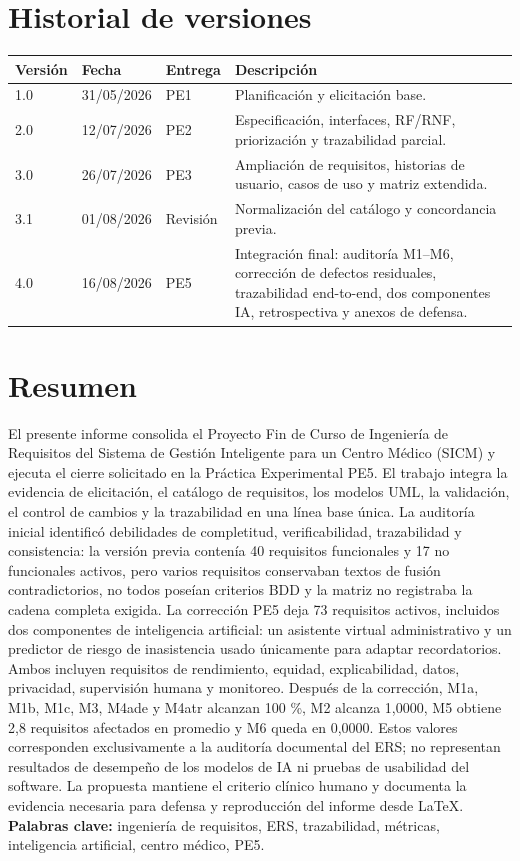 \documentclass[11pt,a4paper]{article}
\begin{document}
	\section*{Historial de versiones}
	\begin{longtable}{p{1.2cm}p{2cm}p{2.4cm}p{9cm}}
		\toprule\textbf{Versión}&\textbf{Fecha}&\textbf{Entrega}&\textbf{Descripción}\\\midrule\endhead
		1.0&31/05/2026&PE1&Planificación y elicitación base.\\
		2.0&12/07/2026&PE2&Especificación, interfaces, RF/RNF, priorización y trazabilidad parcial.\\
		3.0&26/07/2026&PE3&Ampliación de requisitos, historias de usuario, casos de uso y matriz extendida.\\
		3.1&01/08/2026&Revisión&Normalización del catálogo y concordancia previa.\\
		4.0&16/08/2026&PE5&Integración final: auditoría M1--M6, corrección de defectos residuales, trazabilidad end-to-end, dos componentes IA, retrospectiva y anexos de defensa.\\\bottomrule
	\end{longtable}
	\section*{Resumen}
	El presente informe consolida el Proyecto Fin de Curso de Ingeniería de Requisitos del Sistema de Gestión Inteligente para un Centro Médico (SICM) y ejecuta el cierre solicitado en la Práctica Experimental PE5. El trabajo integra la evidencia de elicitación, el catálogo de requisitos, los modelos UML, la validación, el control de cambios y la trazabilidad en una línea base única. La auditoría inicial identificó debilidades de completitud, verificabilidad, trazabilidad y consistencia: la versión previa contenía 40 requisitos funcionales y 17 no funcionales activos, pero varios requisitos conservaban textos de fusión contradictorios, no todos poseían criterios BDD y la matriz no registraba la cadena completa exigida. La corrección PE5 deja 73 requisitos activos, incluidos dos componentes de inteligencia artificial: un asistente virtual administrativo y un predictor de riesgo de inasistencia usado únicamente para adaptar recordatorios. Ambos incluyen requisitos de rendimiento, equidad, explicabilidad, datos, privacidad, supervisión humana y monitoreo. Después de la corrección, M1a, M1b, M1c, M3, M4ade y M4atr alcanzan 100 \%, M2 alcanza 1,0000, M5 obtiene 2,8 requisitos afectados en promedio y M6 queda en 0,0000. Estos valores corresponden exclusivamente a la auditoría documental del ERS; no representan resultados de desempeño de los modelos de IA ni pruebas de usabilidad del software. La propuesta mantiene el criterio clínico humano y documenta la evidencia necesaria para defensa y reproducción del informe desde LaTeX.\\[0.25cm]
	\textbf{Palabras clave:} ingeniería de requisitos, ERS, trazabilidad, métricas, inteligencia artificial, centro médico, PE5.
	\clearpage
\end{document}

